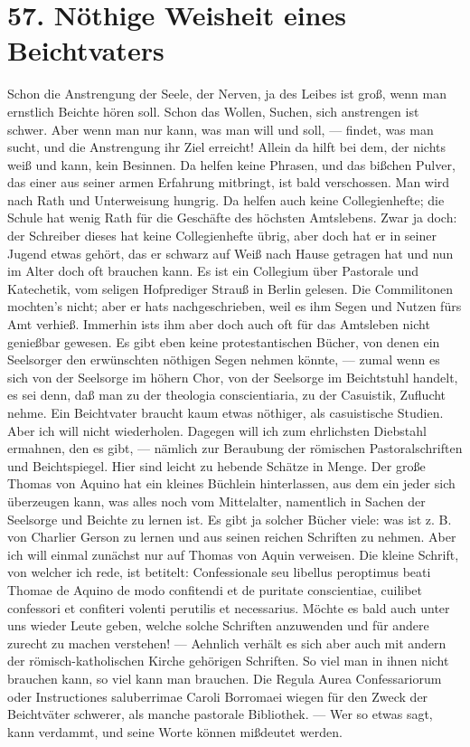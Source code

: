 \section{57. Nöthige Weisheit eines Beichtvaters}

Schon die Anstrengung der Seele, der Nerven, ja des Leibes ist groß, wenn man ernstlich Beichte hören soll. Schon das Wollen, Suchen, sich anstrengen ist schwer. Aber wenn man nur kann, was man will und soll, — findet, was man sucht, und die Anstrengung ihr Ziel erreicht! Allein da hilft bei dem, der nichts weiß und kann, kein Besinnen. Da helfen keine Phrasen, und das bißchen Pulver, das einer aus seiner armen Erfahrung mitbringt, ist bald verschossen. Man wird nach Rath und Unterweisung hungrig. Da helfen auch keine Collegienhefte; die Schule hat wenig Rath für die Geschäfte des höchsten Amtslebens. Zwar ja doch: der Schreiber dieses hat keine Collegienhefte übrig, aber doch hat er in seiner Jugend etwas gehört, das er schwarz auf Weiß nach Hause getragen hat und nun im Alter doch oft brauchen kann. Es ist ein Collegium über Pastorale und Katechetik, vom seligen Hofprediger Strauß in Berlin gelesen. Die Commilitonen mochten's nicht; aber er hats nachgeschrieben, weil es ihm Segen und Nutzen fürs Amt verhieß. Immerhin ists ihm aber doch auch oft für das Amtsleben nicht genießbar gewesen. Es gibt eben keine protestantischen Bücher, von denen ein Seelsorger den erwünschten nöthigen Segen nehmen könnte, —
zumal wenn es sich von der Seelsorge im höhern Chor, von der Seelsorge im Beichtstuhl handelt, es sei denn, daß man zu der theologia conscientiaria, zu der Casuistik, Zuflucht nehme. Ein Beichtvater braucht kaum etwas nöthiger, als casuistische Studien. Aber ich will nicht wiederholen. Dagegen will ich zum ehrlichsten Diebstahl ermahnen, den es gibt, — nämlich zur Beraubung der römischen Pastoralschriften und Beichtspiegel. Hier sind leicht zu hebende Schätze in Menge. Der große Thomas von Aquino hat ein kleines Büchlein hinterlassen, aus dem ein jeder sich überzeugen kann, was alles noch vom Mittelalter, namentlich in Sachen der Seelsorge und Beichte zu lernen ist. Es gibt ja solcher Bücher viele: was ist z. B. von Charlier Gerson zu lernen und aus seinen reichen Schriften zu nehmen. Aber ich will einmal zunächst nur auf Thomas von Aquin verweisen. Die kleine Schrift, von welcher ich rede, ist betitelt: Confessionale seu libellus peroptimus beati Thomae de Aquino de modo confitendi et de puritate conscientiae, cuilibet confessori et confiteri volenti perutilis et necessarius. Möchte es bald auch unter uns wieder Leute geben, welche solche Schriften anzuwenden und für andere zurecht zu machen verstehen! — Aehnlich verhält es sich aber auch mit andern der römisch-katholischen Kirche gehörigen Schriften. So viel man in ihnen nicht brauchen kann, so viel kann man brauchen. Die Regula Aurea Confessariorum oder Instructiones saluberrimae Caroli Borromaei wiegen für den Zweck der Beichtväter schwerer, als manche pastorale Bibliothek. — Wer so etwas sagt, kann verdammt, und seine Worte können mißdeutet werden.

